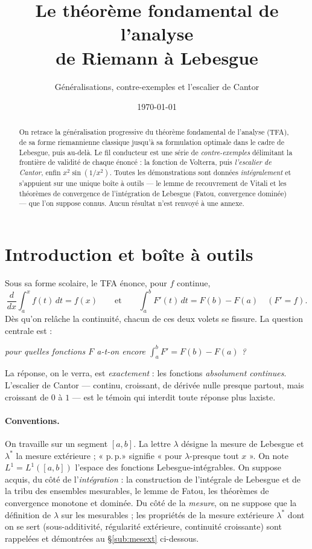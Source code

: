 \documentclass[11pt]{article}
\title{\vspace{-1.2cm}\bfseries\color{NavyBlue}\Large Le théorème fondamental de l'analyse\\[4pt]
\large de Riemann à Lebesgue}
\author{\normalsize Généralisations, contre-exemples et l'escalier de Cantor}
\date{\normalsize\today}
\theoremstyle{thmblue}
\theoremstyle{defplain}
\theoremstyle{rem}
\newcommand{\dt}{\,dt}
\newcommand{\pp}{p.\,p.}
\newcommand{\lstar}{\lambda^{\!*}}
\begin{document}
\maketitle
\thispagestyle{empty}

\begin{abstract}
\noindent
On retrace la généralisation progressive du théorème fondamental de l'analyse (TFA), de sa forme
riemannienne classique jusqu'à sa formulation optimale dans le cadre de Lebesgue, puis au-delà. Le
fil conducteur est une série de \emph{contre-exemples} délimitant la frontière de validité de chaque
énoncé : la fonction de Volterra, puis \emph{l'escalier de Cantor}, enfin $x^2\sin(1/x^2)$. Toutes les
démonstrations sont données \emph{intégralement} et s'appuient sur une unique boîte à outils --- le
lemme de recouvrement de Vitali et les théorèmes de convergence de l'intégration de Lebesgue
(Fatou, convergence dominée) --- que l'on suppose connus. Aucun résultat n'est renvoyé à une annexe.
\end{abstract}

\tableofcontents
\vspace{0.4cm}

\section{Introduction et boîte à outils}

Sous sa forme scolaire, le TFA énonce, pour $f$ continue,
\[
\frac{d}{dx}\int_a^x f(t)\dt = f(x)
\qquad\text{et}\qquad
\int_a^b F'(t)\dt = F(b)-F(a)\quad(F'=f).
\]
Dès qu'on relâche la continuité, chacun de ces deux volets se fissure. La question centrale est :

\begin{center}
\emph{pour quelles fonctions $F$ a-t-on encore $\displaystyle\int_a^b F' = F(b)-F(a)$ ?}
\end{center}

La réponse, on le verra, est \emph{exactement} : les fonctions \emph{absolument continues}.
L'escalier de Cantor --- continu, croissant, de dérivée nulle presque partout, mais croissant de $0$
à $1$ --- est le témoin qui interdit toute réponse plus laxiste.

\paragraph{Conventions.} On travaille sur un segment $[a,b]$. La lettre $\lambda$ désigne la mesure de
Lebesgue et $\lstar$ la mesure extérieure ; « \pp » signifie « pour $\lambda$-presque tout $x$ ».
On note $L^1=L^1([a,b])$ l'espace des fonctions Lebesgue-intégrables. On suppose acquis, du côté de
l'\emph{intégration} : la construction de l'intégrale de Lebesgue et de la tribu des ensembles
mesurables, le lemme de Fatou, les théorèmes de convergence monotone et dominée. Du côté de la
\emph{mesure}, on ne suppose que la définition de $\lambda$ sur les mesurables ; les propriétés de la
mesure extérieure $\lstar$ dont on se sert (sous-additivité, régularité extérieure, continuité
croissante) sont rappelées et démontrées au §\ref{sub:mesext} ci-dessous.
\end{document}
